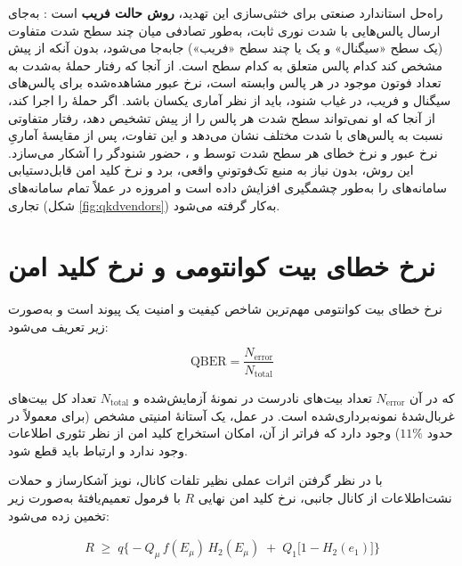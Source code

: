 راه‌حل استاندارد صنعتی برای خنثی‌سازی این تهدید، \textbf{روش حالت فریب}  است \Cite{lo2005decoy}: به‌جای ارسال پالس‌هایی با شدت نوری ثابت،  به‌طور تصادفی میان چند سطح شدت متفاوت (یک سطح «سیگنال» و یک یا چند سطح «فریب») جابه‌جا می‌شود، بدون آنکه از پیش مشخص کند کدام پالس متعلق به کدام سطح است. از آنجا که رفتار حملهٔ  به‌شدت به تعداد فوتون موجود در هر پالس وابسته است، نرخ عبور  مشاهده‌شده برای پالس‌های سیگنال و فریب، در غیاب شنود، باید از نظر آماری یکسان باشد. اگر  حملهٔ  را اجرا کند، از آنجا که او نمی‌تواند سطح شدت هر پالس را از پیش تشخیص دهد، رفتار متفاوتی نسبت به پالس‌های با شدت مختلف نشان می‌دهد و این تفاوت، پس از مقایسهٔ آماریِ نرخ عبور و نرخ خطای هر سطح شدت توسط  و ، حضور شنودگر را آشکار می‌سازد. این روش، بدون نیاز به منبع تک‌فوتونیِ واقعی، برد و نرخ کلید امن قابل‌دستیابی سامانه‌های  را به‌طور چشمگیری افزایش داده است و امروزه در عملاً تمام سامانه‌های تجاری  (شکل \ref{fig:qkdvendors}) به‌کار گرفته می‌شود.

\section{نرخ خطای بیت کوانتومی و نرخ کلید امن}
\label{sec:qberrate}

نرخ خطای بیت کوانتومی  مهم‌ترین شاخص کیفیت و امنیت یک پیوند  است و به‌صورت زیر تعریف می‌شود:

\begin{equation}
\label{eq:qber}
\mathrm{QBER} = \frac{N_{\text{error}}}{N_{\text{total}}}
\end{equation}

که در آن $N_{\text{error}}$ تعداد بیت‌های نادرست در نمونهٔ آزمایش‌شده و $N_{\text{total}}$ تعداد کل بیت‌های غربال‌شدهٔ نمونه‌برداری‌شده است. در عمل، یک آستانهٔ امنیتی مشخص (برای  معمولاً در حدود $11\%$) وجود دارد که فراتر از آن، امکان استخراج کلید امن از نظر تئوری اطلاعات وجود ندارد و ارتباط باید قطع شود.

با در نظر گرفتن اثرات عملی نظیر تلفات کانال، نویز آشکارساز و حملات نشت‌اطلاعات از کانال جانبی، نرخ کلید امن نهایی $R$ با فرمول تعمیم‌یافتهٔ   به‌صورت زیر تخمین زده می‌شود:

\begin{align}
\label{eq:gllp}
R \;\geq\; q \Big\{ -Q_{\mu}\, f(E_{\mu})\, H_2(E_{\mu}) \;+\; Q_1 \big[1 - H_2(e_1)\big] \Big\}
\end{align}

